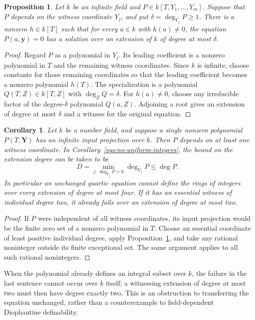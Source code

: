 \documentclass[11pt,a4paper]{article}
\newtheorem{proposition}[theorem]{Proposition}
\newtheorem{corollary}[theorem]{Corollary}
\theoremstyle{definition}
\begin{document}
\begin{proposition}\label{sys:hypersurface-extension-bound}
Let $k$ be an infinite field and
$P\in k[T,Y_1,\ldots,Y_m]$. Suppose that $P$ depends on the
witness coordinate $Y_j$, and put $\delta=\deg_{Y_j}P\ge1$.
There is a nonzero $h\in k[T]$ such that for every $a\in k$
with $h(a)\ne0$, the equation $P(a,\mathbf y)=0$ has a solution
over an extension of $k$ of degree at most $\delta$.
\end{proposition}
\begin{proof}
Regard $P$ as a polynomial in $Y_j$. Its leading coefficient
is a nonzero polynomial in $T$ and the remaining witness
coordinates. Since $k$ is infinite, choose constants for those
remaining coordinates so that the leading coefficient becomes
a nonzero polynomial $h(T)$. The specialization is a polynomial
$Q(T,Z)\in k[T,Z]$ with $\deg_ZQ=\delta$. For $h(a)\ne0$,
choose any irreducible factor of the degree-$\delta$ polynomial
$Q(a,Z)$. Adjoining a root gives an extension of degree at
most $\delta$ and a witness for the original equation.
\end{proof}

\begin{corollary}\label{sys:single-polynomial-extension}
Let $k$ be a number field, and suppose a single nonzero polynomial
$P(T,\mathbf Y)$ has an infinite input projection over $k$.
Then $P$ depends on at least one witness coordinate. In
Corollary~\ref{sys:no-uniform-integers}, the bound on the extension
degree can be taken to be
\[
            D=\min_{j:\,\deg_{Y_j}P>0}\deg_{Y_j}P
               \le \deg P.
\]
In particular an unchanged quartic equation cannot define the
rings of integers over every extension of degree at most four.
If it has an essential witness of individual degree two, it
already fails over an extension of degree at most two.
\end{corollary}
\begin{proof}
If $P$ were independent of all witness coordinates, its input
projection would be the finite zero set of a nonzero polynomial
in $T$. Choose an essential coordinate of least positive
individual degree, apply Proposition~\ref{sys:hypersurface-extension-bound},
and take any rational noninteger outside its finite exceptional
set. The same argument applies to all such rational nonintegers.
\end{proof}

When the polynomial already defines an integral subset over
$k$, the failure in the last sentence cannot occur over $k$
itself; a witnessing extension of degree at most two must then
have degree exactly two. This is an obstruction to transferring
the equation unchanged, rather than a counterexample to
field-dependent Diophantine definability.
\end{document}
